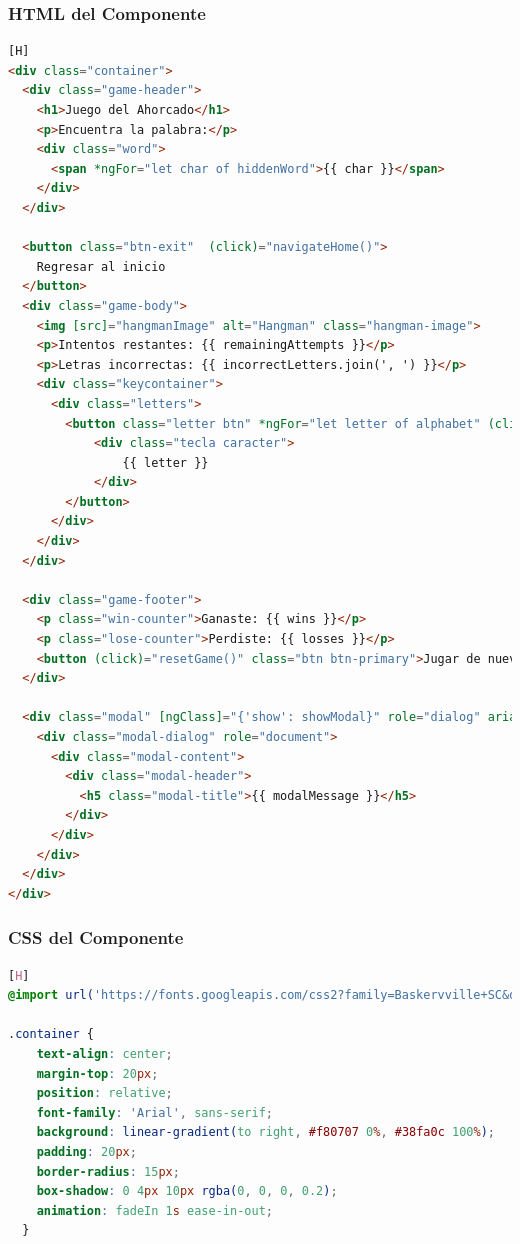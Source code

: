 \documentclass{article}
\begin{document}
\begin{itemize}
\subsubsection{HTML del Componente}

\begin{lstlisting}[language=html,caption ={src\app\components\game\game.component.html}][H]
<div class="container">
  <div class="game-header">
    <h1>Juego del Ahorcado</h1>
    <p>Encuentra la palabra:</p>
    <div class="word">
      <span *ngFor="let char of hiddenWord">{{ char }}</span>
    </div>
  </div>

  <button class="btn-exit"  (click)="navigateHome()">
    Regresar al inicio
  </button>
  <div class="game-body">
    <img [src]="hangmanImage" alt="Hangman" class="hangman-image">
    <p>Intentos restantes: {{ remainingAttempts }}</p>
    <p>Letras incorrectas: {{ incorrectLetters.join(', ') }}</p>
    <div class="keycontainer">
      <div class="letters">
        <button class="letter btn" *ngFor="let letter of alphabet" (click)="guessLetter(letter)" [disabled]="isLetterGuessed(letter)">
            <div class="tecla caracter">
                {{ letter }}
            </div>
        </button>
      </div>
    </div>
  </div>
  
  <div class="game-footer">
    <p class="win-counter">Ganaste: {{ wins }}</p>
    <p class="lose-counter">Perdiste: {{ losses }}</p>
    <button (click)="resetGame()" class="btn btn-primary">Jugar de nuevo</button>
  </div>
  
  <div class="modal" [ngClass]="{'show': showModal}" role="dialog" aria-hidden="true">
    <div class="modal-dialog" role="document">
      <div class="modal-content">
        <div class="modal-header">
          <h5 class="modal-title">{{ modalMessage }}</h5>
        </div>
      </div>
    </div>
  </div>
</div>
\end{lstlisting}

\subsubsection{CSS del Componente}

\begin{lstlisting}[language=css,caption ={src\app\components\game\game.component.css}][H]
@import url('https://fonts.googleapis.com/css2?family=Baskervville+SC&display=swap');

.container {
    text-align: center;
    margin-top: 20px;
    position: relative;
    font-family: 'Arial', sans-serif;
    background: linear-gradient(to right, #f80707 0%, #38fa0c 100%);
    padding: 20px;
    border-radius: 15px;
    box-shadow: 0 4px 10px rgba(0, 0, 0, 0.2);
    animation: fadeIn 1s ease-in-out;
  }
  

\end{lstlisting}
\end{itemize}
\end{document}
